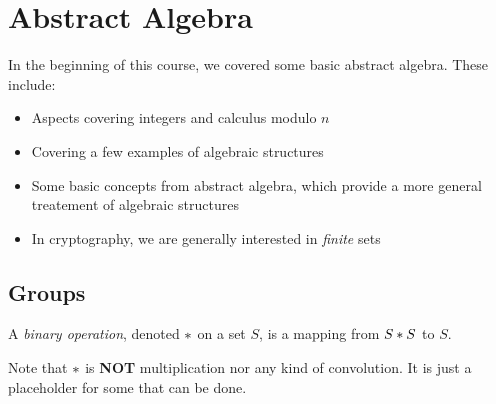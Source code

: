 \section{Abstract Algebra}\label{sec:Abstract_Algebra}
In the beginning of this course, we covered some basic abstract algebra.
These include:
\begin{itemize}[noitemsep]
\item Aspects covering integers and calculus modulo $n$
\item Covering a few examples of algebraic structures
\item Some basic concepts from abstract algebra, which provide a more general treatement of algebraic structures
\item In cryptography, we are generally interested in \emph{finite} sets
\end{itemize}

\subsection{Groups}\label{subsec:Groups}
\begin{definition}\label{def:Binary_Operation}
  A \emph{binary operation}, denoted $*$ on a set $S$, is a mapping from $S * S$ to $S$.
  \begin{remark}
    Note that $*$ is \textbf{NOT} multiplication nor any kind of convolution.
    It is just a placeholder for some  that can be done.
  \end{remark}
\end{definition}

